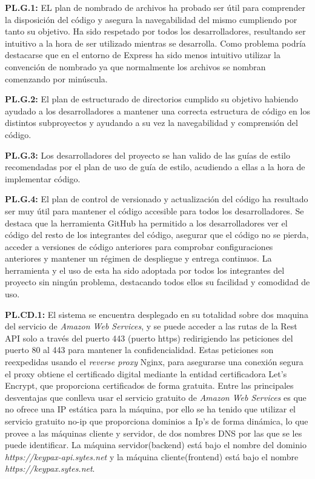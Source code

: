 \documentclass{article}
\begin{document}
\textbf{PL.G.1:}
EL plan de nombrado de archivos ha probado ser útil para comprender la disposición del código y asegura la navegabilidad del mismo cumpliendo por tanto su objetivo. Ha sido respetado por todos los desarrolladores, resultando ser intuitivo a la hora de ser utilizado mientras se desarrolla. Como problema podría destacarse que en el entorno de Express ha sido menos intuitivo utilizar la convención de nombrado ya que normalmente los archivos se nombran comenzando por minúscula.
 
\textbf{PL.G.2:}
El plan de estructurado de directorios cumplido su objetivo habiendo ayudado a los desarrolladores a mantener una correcta estructura de código en los distintos subproyectos y ayudando a su vez la navegabilidad y comprensión del código.
 
\textbf{PL.G.3:}
Los desarrolladores del proyecto se han valido de las guías de estilo recomendadas por el plan de uso de guía de estilo, acudiendo a ellas a la hora de implementar código.
 
\textbf{PL.G.4:}
El plan de control de versionado y actualización del código ha resultado ser muy útil para mantener el código accesible para todos los desarrolladores. Se destaca que la herramienta GitHub ha permitido a los desarrolladores ver el código del resto de los integrantes del código, asegurar que el código no se pierda, acceder a versiones de código anteriores para comprobar configuraciones anteriores y mantener un régimen de despliegue y entrega continuos. La herramienta y el uso de esta ha sido adoptada por todos los integrantes del proyecto sin ningún problema, destacando todos ellos su facilidad y comodidad de uso.
 
\textbf{PL.CD.1:}
El sistema se encuentra desplegado en su totalidad sobre dos maquina del servicio de \textit{Amazon Web Services}, y se puede acceder a las rutas de la Rest API solo a través del puerto 443 (puerto https) redirigiendo las peticiones del puerto 80 al 443 para mantener la confidencialidad. Estas peticiones son reexpedidas usando el \textit{reverse proxy} Nginx, para asegurarse una conexión segura el proxy obtiene el certificado digital mediante la entidad certificadora Let's Encrypt, que proporciona certificados de forma gratuita.
Entre las principales desventajas que conlleva usar el servicio gratuito de \textit{Amazon Web Services} es que no ofrece una IP estática para la máquina, por ello se ha tenido que utilizar el servicio gratuito no-ip que proporciona dominios a Ip's de forma dinámica, lo que provee a las máquinas cliente y servidor, de dos nombres DNS por las que se les puede identificar. La máquina servidor(backend) está bajo el nombre del dominio \textit{https://keypax-api.sytes.net} y la máquina cliente(frontend) está bajo el nombre \textit{https://keypax.sytes.net}.
 
\end{document}
